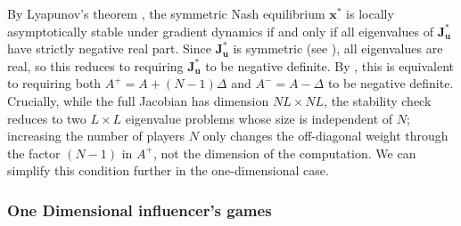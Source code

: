 \documentclass{article}
\begin{document}
            By Lyapunov's theorem \cite[Thm.~1 §8.4]{hirsch2013differential}, the symmetric Nash equilibrium $\mathbf{x}^*$ is locally asymptotically stable under gradient dynamics if and only if all eigenvalues of $\mathbf{J}_{\mathbf{u}}^*$ have strictly negative real part. Since $\mathbf{J}_{\mathbf{u}}^*$ is symmetric (see ), all eigenvalues are real, so this reduces to requiring $\mathbf{J}_{\mathbf{u}}^*$ to be negative definite. By , this is equivalent to requiring both $A^{+} = A+(N-1)\Delta$ and $A^{-} = A-\Delta$ to be negative definite. Crucially, while the full Jacobian has dimension $NL\times NL$, the stability check reduces to two $L\times L$ eigenvalue problems whose size is independent of $N$; increasing the number of players $N$ only changes the off-diagonal weight through the factor $(N-1)$ in $A^{+}$, not the dimension of the computation. We can simplify this condition further in the one-dimensional case.
            \subsubsection{One Dimensional influencer's games}\label{subsubsec:SI_one-dimensional}
                
\end{document}
